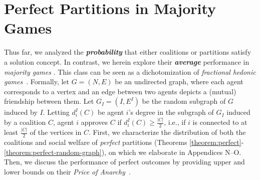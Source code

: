 \documentclass[letterpaper]{article} %
\begin{document}
\section{Perfect Partitions in Majority Games}
\label{sec:Perfect Partitions in Majority Games}
Thus far, we analyzed the \textit{\textbf{probability}} that either coalitions or partitions satisfy a solution concept. In contrast, we herein explore their \textit{\textbf{average}} performance in \textit{majority games} \cite{peters2016complexity}. This class can be seen as a dichotomization of \textit{fractional hedonic games}~\cite{aziz2019fractional}. Formally, let $G = (N, E)$ be an undirected graph, where each agent corresponds to a vertex and an edge between two agents depicts a (mutual) friendship between them. Let $G_I = (I, E^I)$ be the random subgraph of $G$ induced by $I$. Letting $d_i^I(C)$ be agent $i$'s degree in the subgraph of $G_I$ induced by a coalition $C$, agent $i$ approves $C$ if $d_i^I(C) \geq \frac{|C|}{2}$, i.e., if $i$ is connected to at least $\frac{|C|}{2}$ of the vertices in $C$. First, we characterize the distribution of both the coalitions and social welfare of \textit{perfect} partitions (Theorems \ref{theorem:perfect}-\ref{theorem:perfect-random-graph}), on which we elaborate in Appendices N--O. Then, we discuss the performance of perfect outcomes by providing upper and lower bounds on their \textit{Price of Anarchy}~\cite{koutsoupias1999worst}.
\end{document}
